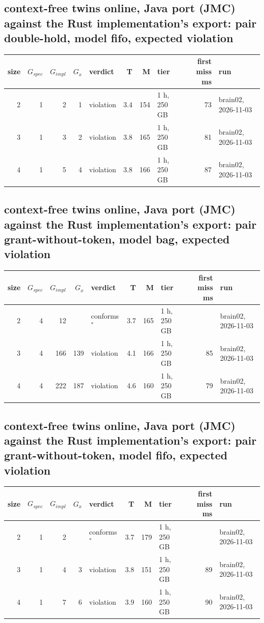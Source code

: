 \documentclass[10pt]{article}
\begin{document}
\subsection*{context-free twins online, Java port (JMC) against the Rust implementation's export: pair \textsf{double-hold}, model fifo, expected violation}
\begin{longtable}{@{}rrrrlrrlrl@{}}
\toprule
size & $G_{\mathit{spec}}$ & $G_{\mathit{impl}}$ & $G_x$ & verdict & T & M & tier & first miss ms & run \\
\midrule
\endhead
\color{red} 2 & 1 & 2 & 1 & violation & 3.4 & 154 & 1 h, 250 GB & 73 & brain02, 2026-11-03 \\
\color{red} 3 & 1 & 3 & 2 & violation & 3.8 & 165 & 1 h, 250 GB & 81 & brain02, 2026-11-03 \\
\color{red} 4 & 1 & 5 & 4 & violation & 3.8 & 166 & 1 h, 250 GB & 87 & brain02, 2026-11-03 \\
\bottomrule
\end{longtable}
\subsection*{context-free twins online, Java port (JMC) against the Rust implementation's export: pair \textsf{grant-without-token}, model bag, expected violation}
\begin{longtable}{@{}rrrrlrrlrl@{}}
\toprule
size & $G_{\mathit{spec}}$ & $G_{\mathit{impl}}$ & $G_x$ & verdict & T & M & tier & first miss ms & run \\
\midrule
\endhead
\color{red} 2 & 4 & 12 &  & conforms$^{\ast}$ & 3.7 & 165 & 1 h, 250 GB &  & brain02, 2026-11-03 \\
\color{red} 3 & 4 & 166 & 139 & violation & 4.1 & 166 & 1 h, 250 GB & 85 & brain02, 2026-11-03 \\
\color{red} 4 & 4 & 222 & 187 & violation & 4.6 & 160 & 1 h, 250 GB & 79 & brain02, 2026-11-03 \\
\bottomrule
\end{longtable}
\subsection*{context-free twins online, Java port (JMC) against the Rust implementation's export: pair \textsf{grant-without-token}, model fifo, expected violation}
\begin{longtable}{@{}rrrrlrrlrl@{}}
\toprule
size & $G_{\mathit{spec}}$ & $G_{\mathit{impl}}$ & $G_x$ & verdict & T & M & tier & first miss ms & run \\
\midrule
\endhead
\color{red} 2 & 1 & 2 &  & conforms$^{\ast}$ & 3.7 & 179 & 1 h, 250 GB &  & brain02, 2026-11-03 \\
\color{red} 3 & 1 & 4 & 3 & violation & 3.8 & 151 & 1 h, 250 GB & 89 & brain02, 2026-11-03 \\
\color{red} 4 & 1 & 7 & 6 & violation & 3.9 & 160 & 1 h, 250 GB & 90 & brain02, 2026-11-03 \\
\bottomrule
\end{longtable}
\end{document}

